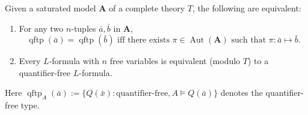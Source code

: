 Given a saturated model $\mathbf{A}$ of a complete theory $T$, the following are equivalent:
\begin{enumerate}
\item For any two $n$-tuples $\bar{a}, \bar{b}$ in $\mathbf{A}$,
$$\operatorname{qftp}(\bar{a}) = \operatorname{qftp}(\bar{b}) \text{ iff there exists } \pi \in \operatorname{Aut}(\mathbf{A}) \text{ such that } \pi : \bar{a} \mapsto \bar{b}.$$
\item Every $L$-formula with $n$ free variables is equivalent (modulo $T$) to a quantifier-free $L$-formula.
\end{enumerate}
Here $\operatorname{qftp}_A(\bar{a}) := \{Q(\bar{x}) : \text{quantifier-free}, A \vDash Q(\bar{a})\}$ denotes the quantifier-free type.
